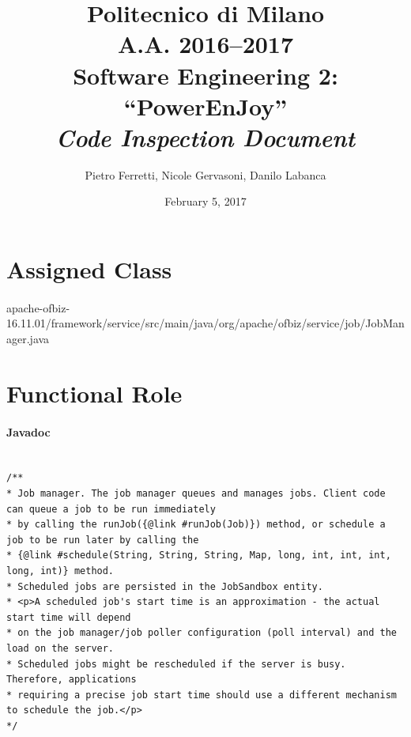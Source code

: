 \documentclass[english]{article}
\begin{document}
\title{Politecnico di Milano\\
 A.A. 2016–2017 \\
Software Engineering 2: “PowerEnJoy” \\
\emph{Code Inspection Document}}

\author{Pietro Ferretti, Nicole Gervasoni, Danilo Labanca}
\date{February 5, 2017}
\maketitle

\newpage

\tableofcontents{}

\newpage

\section{Assigned Class}
\paragraph{}
apache-ofbiz-16.11.01/framework/service/src/main/java/org/apache/ofbiz/service/job/JobManager.java

\section{Functional Role}%

\paragraph{Javadoc}

\begin{lstlisting}

/**
* Job manager. The job manager queues and manages jobs. Client code can queue a job to be run immediately
* by calling the runJob({@link #runJob(Job)}) method, or schedule a job to be run later by calling the
* {@link #schedule(String, String, String, Map, long, int, int, int, long, int)} method.
* Scheduled jobs are persisted in the JobSandbox entity.
* <p>A scheduled job's start time is an approximation - the actual start time will depend
* on the job manager/job poller configuration (poll interval) and the load on the server.
* Scheduled jobs might be rescheduled if the server is busy. Therefore, applications
* requiring a precise job start time should use a different mechanism to schedule the job.</p>
*/
\end{lstlisting}
\end{document}
